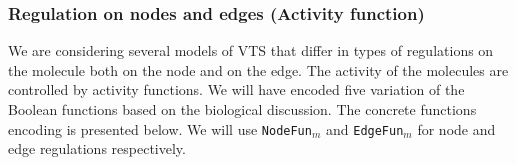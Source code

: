 


\subsubsection{Regulation on nodes and edges (Activity function)}
We are considering several models of VTS that differ in types of regulations on the molecule both on the node and on the edge.  
%
%
The activity of the molecules are controlled by activity functions.
%
We will have encoded five variation of the Boolean functions based on the biological discussion.
%
The concrete functions encoding is presented below.
%
We will use \texttt{NodeFun}$_m$ and \texttt{EdgeFun}$_m$ for node and edge regulations respectively.
%

